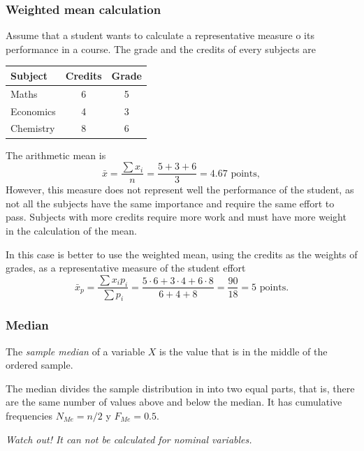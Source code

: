 \begin{frame}
\frametitle{Weighted mean calculation}
Assume that a student wants to calculate a representative measure o its performance in a course. 
The grade and the credits of every subjects are 
\begin{center}
\begin{tabular}{lcc}
\hline
Subject & Credits & Grade\\
\hline
Maths & 6 & 5 \\
Economics & 4 & 3 \\
Chemistry & 8 & 6 \\
\hline
\end{tabular}
\end{center}
The arithmetic mean is 
\[
\bar{x} = \frac{\sum x_i}{n} = \frac{5+3+6}{3}= 4.67 \text{ points},
\]
However, this measure does not represent well the performance of the student, as not all the subjects have the same
importance and require the same effort to pass. 
Subjects with more credits require more work and must have more weight in the calculation of the mean. 

In this case is better to use the weighted mean, using the credits as the
weights of grades, as a representative measure of the student effort
\[
\bar{x}_p = \frac{\sum x_ip_i}{\sum p_i} = \frac{5\cdot 6+3\cdot 4+6\cdot 8}{6+4+8}= \frac{90}{18} = 5 \text{ points}.
\]
\end{frame}


\begin{frame}
\frametitle{Median}
\begin{definition}
The \emph{sample median} of a variable $X$ is the value that is in the middle of the ordered sample. 
\end{definition}

The median divides the sample distribution in into two equal parts, that is, there are the same number of values above
and below the median.
It has cumulative frequencies $N_{Me}= n/2$ y  $F_{Me}= 0.5$.

\begin{center}
\alert{\emph{Watch out! It can not be calculated for nominal variables.}}
\end{center}

\end{frame}


